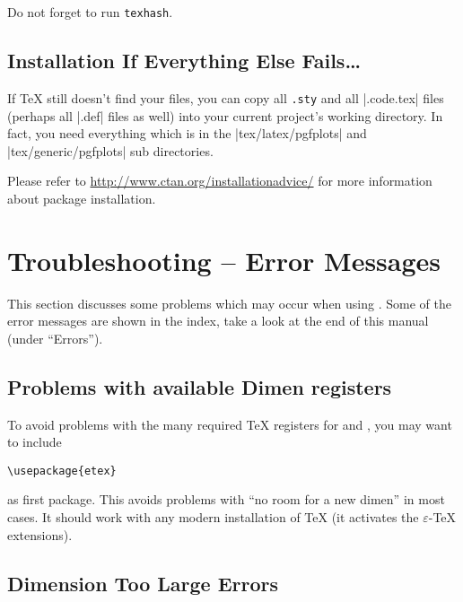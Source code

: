 Do not forget to run \lstinline!texhash!.

\subsection{Installation If Everything Else Fails\ldots}

If \TeX{} still doesn't find your files, you can copy all \lstinline!.sty! and
all |.code.tex| files (perhaps all |.def| files as well) into your current
project's working directory. In fact, you need everything which is in the
|tex/latex/pgfplots| and |tex/generic/pgfplots| sub directories.

Please refer to \url{http://www.ctan.org/installationadvice/} for more
information about package installation.


\section{Troubleshooting -- Error Messages}

This section discusses some problems which may occur when using \PGFPlots{}.
Some of the error messages are shown in the index, take a look at the end of
this manual (under ``Errors'').


\subsection{Problems with available Dimen registers}

To avoid problems with the many required \TeX{} registers for \PGF{} and
\PGFPlots{}, you may want to include
%
\begin{verbatim}
\usepackage{etex}
\end{verbatim}
%
as first package. This avoids problems with ``no room for a new
dimen'' in most cases. It should
work with any modern installation of \TeX{} (it activates the
$\varepsilon$-\TeX{} extensions).


\subsection{Dimension Too Large Errors}

